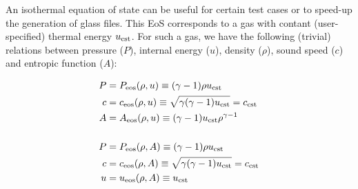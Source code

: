 An isothermal equation of state can be useful for certain test cases
or to speed-up the generation of glass files. This EoS corresponds to
a gas with contant (user-specified) thermal energy $u_{\rm cst}$. For such a gas,
we have the following (trivial) relations between pressure ($P$), internal energy
($u$), density ($\rho$), sound speed ($c$) and entropic function ($A$):

\begin{align}
  P &= P_{\rm eos}(\rho, u) \equiv  (\gamma-1) \rho
  u_{\rm cst} \label{eq:eos:isothermal:P_from_u} \\
  c &= c_{\rm eos}(\rho, u) \equiv \sqrt{\gamma (\gamma-1)
    u_{\rm cst}} = c_{\rm cst} \label{eq:eos:isothermal:c_from_u} \\
  A &= A_{\rm eos}(\rho, u) \equiv(\gamma-1) u_{\rm cst}
  \rho^{\gamma-1} \label{eq:eos:isothermal:A_from_u} \\ 
  ~ \nonumber\\
  P &= P_{\rm eos}(\rho, A) \equiv (\gamma-1) \rho
  u_{\rm cst} \label{eq:eos:isothermal:P_from_A} \\
  c &= c_{\rm eos}(\rho, A) \equiv \sqrt{\gamma (\gamma-1)
    u_{\rm cst}} = c_{\rm cst} \label{eq:eos:isothermal:c_from_A} \\
  u &= u_{\rm eos}(\rho, A) \equiv u_{\rm
    cst} \label{eq:eos:isothermal:u_from_A} 
\end{align}
